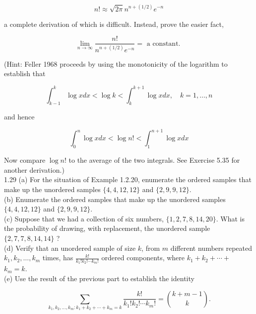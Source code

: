 \documentclass[10pt]{article}
\begin{document}
$$
n!\approx \sqrt{2 \pi} n^{n+(1 / 2)} e^{-n}
$$

a complete derivation of which is difficult. Instead, prove the easier fact,

$$
\lim _{n \rightarrow \infty} \frac{n!}{n^{n+(1 / 2)} e^{-n}}=\text { a constant. }
$$

(Hint: Feller 1968 proceeds by using the monotonicity of the logarithm to establish that

$$
\int_{k-1}^{k} \log x d x<\log k<\int_{k}^{k+1} \log x d x, \quad k=1, \ldots, n
$$

and hence

$$
\int_{0}^{n} \log x d x<\log n!<\int_{1}^{n+1} \log x d x
$$

Now compare $\log n!$ to the average of the two integrals. See Exercise 5.35 for another derivation.)\\
1.29 (a) For the situation of Example 1.2.20, enumerate the ordered samples that make up the unordered samples $\{4,4,12,12\}$ and $\{2,9,9,12\}$.\\
(b) Enumerate the ordered samples that make up the unordered samples $\{4,4,12,12\}$ and $\{2,9,9,12\}$.\\
(c) Suppose that we had a collection of six numbers, $\{1,2,7,8,14,20\}$. What is the probability of drawing, with replacement, the unordered sample $\{2,7,7,8,14,14\}$ ?\\
(d) Verify that an unordered sample of size $k$, from $m$ different numbers repeated $k_{1}, k_{2}, \ldots, k_{m}$ times, has $\frac{k!}{k_{1}!k_{2}!\cdots k_{m}!}$ ordered components, where $k_{1}+k_{2}+\cdots+$ $k_{m}=k$.\\
(e) Use the result of the previous part to establish the identity

$$
\sum_{k_{1}, k_{2}, \ldots, k_{m}: k_{1}+k_{2}+\cdots+k_{m}=k} \frac{k!}{k_{1}!k_{2}!\cdots k_{m}!}=\binom{k+m-1}{k} .
$$
\end{document}
